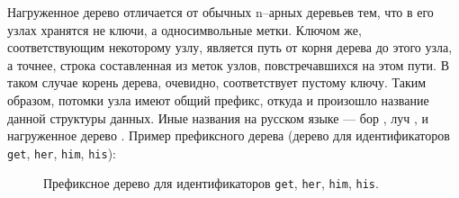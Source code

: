 \documentclass[10pt]{report}
\newcounter{exam}[section]
\begin{document}
Нагруженное дерево отличается от обычных n--арных деревьев тем, что в его узлах хранятся не ключи, а односимвольные метки. Ключом же, соответствующим некоторому узлу, является путь от корня дерева до этого узла, а точнее, строка составленная из меток узлов, повстречавшихся на этом пути. В таком случае корень дерева, очевидно, соответствует пустому ключу. Таким образом, потомки узла имеют общий префикс, откуда и произошло название данной структуры данных. Иные названия на русском языке --- бор \cite{KnuthV3-1978}, луч \cite{KnuthV3}, и нагруженное дерево \cite[с.152]{AhoHopcroftUllman}. Пример префиксного дерева (дерево для идентификаторов \texttt{get}, \texttt{her}, \texttt{him}, \texttt{his}):
\begin{figure}[!h]
\centering
{}
\caption{Префиксное дерево для идентификаторов \texttt{get}, \texttt{her}, \texttt{him}, \texttt{his}.}\label{Prefix.tree.example}
\end{figure}
\end{document}
